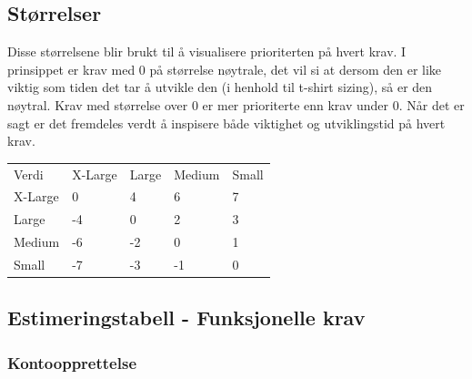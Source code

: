 \documentclass[12pt]{article}
\newcommand{\invis}{\phantom{a}}
\newcommand{\cellr}{\cellcolor{red!25}}
\newcommand{\cello}{\cellcolor{orange!25}}
\newcommand{\celly}{\cellcolor{yellow!25}}
\newcommand{\celll}{\cellcolor{lime!25}}
\newcommand{\cellg}{\cellcolor{green!25}}
\begin{document}
    \subsection{Størrelser}
    Disse størrelsene blir brukt til å visualisere prioriterten på hvert krav. I prinsippet er krav med 0 på størrelse nøytrale, det vil si at dersom den er like viktig som tiden det tar å utvikle den (i henhold til t-shirt sizing), så er den nøytral. Krav med størrelse over 0 er mer prioriterte enn krav under 0. Når det er sagt er det fremdeles verdt å inspisere både viktighet og utviklingstid på hvert krav.

    \begin{tabular}{|p{2cm}|
        >{\centering\arraybackslash}p{3cm}|
        >{\centering\arraybackslash}p{3cm}|
        >{\centering\arraybackslash}p{3cm}|
        >{\centering\arraybackslash}p{3cm}|}     
        \hline 
        \invis & \multicolumn{4}{|c|}{Utviklingsstørrelse}\\
        \hline
        Verdi & X-Large & Large & Medium & Small\\
        \hline
        X-Large &   \celly0 &
                    \cellg4 &
                    \cellg6 &
                    \cellg7 \\
        \hline
        Large &     \cellr-4 &
                    \celly0 &
                    \celll2 &
                    \cellg3 \\
        \hline
        Medium &    \cellr-6 &
                    \cello-2 &
                    \celly0 &
                    \celll1 \\
        \hline
        Small &     \cellr-7 &
                    \cellr-3 &
                    \cello-1 &
                    \celly0 \\
        \hline 
    \end{tabular}

    \subsection{Estimeringstabell - Funksjonelle krav}

        \subsubsection{Kontoopprettelse}
        
\end{document}

